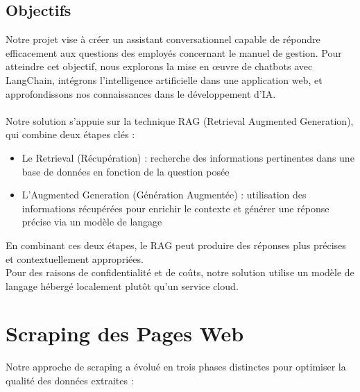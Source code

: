 \documentclass{article}
\begin{document}
\subsection{Objectifs}
\quad Notre projet vise à créer un assistant conversationnel capable de répondre efficacement aux questions des employés concernant le manuel de gestion. Pour atteindre cet objectif, nous explorons la mise en œuvre de chatbots avec LangChain, intégrons l'intelligence artificielle dans une application web, et approfondissons nos connaissances dans le développement d'IA.\\
\\
Notre solution s'appuie sur la technique RAG (Retrieval Augmented Generation), qui combine deux étapes clés : 
\begin{itemize} 
    \item Le Retrieval (Récupération) : recherche des informations pertinentes dans une base de données en fonction de la question posée 
    \item L'Augmented Generation (Génération Augmentée) : utilisation des informations récupérées pour enrichir le contexte et générer une réponse précise via un modèle de langage 
\end{itemize}
En combinant ces deux étapes, le RAG peut produire des réponses plus précises et contextuellement appropriées.\\

Pour des raisons de confidentialité et de coûts, notre solution utilise un modèle de langage hébergé localement plutôt qu'un service cloud.

\clearpage

\section{Scraping des Pages Web}

Notre approche de scraping a évolué en trois phases distinctes pour optimiser la qualité des données extraites :
\end{document}
